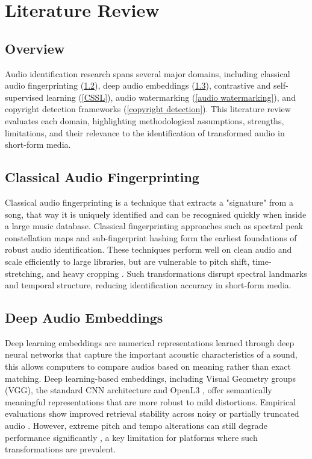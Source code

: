 \documentclass[../Thesis]{subfiles}
\begin{document}
\chapter{Literature Review} \label{chapter2}
\section{Overview}
Audio identification research spans several major domains, including classical audio fingerprinting (\ref{classic audio}), deep audio embeddings (\ref{Deep audio}), contrastive and self-supervised learning (\ref{CSSL}), audio watermarking (\ref{audio watermarking}), and copyright detection frameworks (\ref{copyright detection}). This literature review evaluates each domain, highlighting methodological assumptions, strengths, limitations, and their relevance to the identification of transformed audio in short-form media.

\section{Classical Audio Fingerprinting} \label{classic audio}
Classical audio fingerprinting is a technique that extracts a "signature" from a song, that way it is uniquely identified and can be recognised quickly when inside a large music database. Classical fingerprinting approaches such as spectral peak constellation maps \parencite{wang2003industrial} and sub-fingerprint hashing \parencite{haitsma2002robust} form the earliest foundations of robust audio identification. These techniques perform well on clean audio and scale efficiently to large libraries, but are vulnerable to pitch shift, time-stretching, and heavy cropping \parencite{cano2005review,ke2005vision}. Such transformations disrupt spectral landmarks and temporal structure, reducing identification accuracy in short-form media.

\section{Deep Audio Embeddings} \label{Deep audio}
Deep learning embeddings are numerical representations learned through deep neural networks that capture the important acoustic characteristics of a sound, this allows computers to compare audios based on meaning rather than exact matching. Deep learning-based embeddings, including Visual Geometry groups (VGG), the standard CNN architecture \parencite{hershey2017cnn} and OpenL3 \parencite{cramer2019openl3}, offer semantically meaningful representations that are more robust to mild distortions. Empirical evaluations show improved retrieval stability across noisy or partially truncated audio \parencite{fonseca2020fsd50k}. However, extreme pitch and tempo alterations can still degrade performance significantly \parencite{hung2021music}, a key limitation for platforms where such transformations are prevalent.
\end{document}
